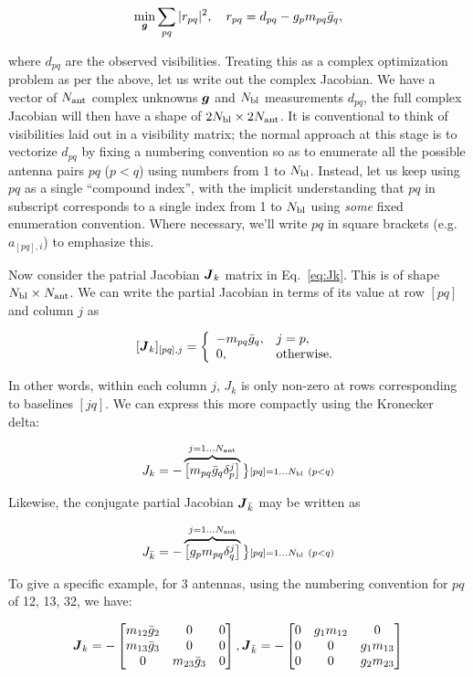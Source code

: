 \documentclass[useAMS,usenatbib]{mn2e}
\newcommand{\mat}[1]{{\bmath{#1}}}
\newcommand{\JJ}{\mat{J}} %
\begin{document}
\begin{equation}
\label{eq:cal:DI}
\min_{\bmath{g}}\sum_{pq}|r_{pq}|^2,~~~r_{pq}=d_{pq}-g_p m_{pq} \bar{g}_q, 
\end{equation}

where $d_{pq}$ are the observed visibilities. Treating this as a complex optimization problem as per the above, 
let us write out the complex Jacobian. 
We have a vector of $N_\mathrm{ant}$ complex unknowns $\bmath{g}$ and $N_\mathrm{bl}$ measurements $d_{pq}$, the full complex
Jacobian will then have a shape of $2N_\mathrm{bl}\times2N_\mathrm{ant}$. It is conventional
to think of visibilities laid out in a visibility matrix; the normal approach at this stage is to vectorize $d_{pq}$ 
by fixing a numbering convention so as to enumerate all the possible antenna pairs $pq$ ($p<q$) using numbers from 1 to $N_\mathrm{bl}$.
Instead, let us keep using $pq$ as a single ``compound index'', with the implicit understanding that $pq$ in 
subscript corresponds to a single index from 1 to $N_\mathrm{bl}$ using \emph{some} fixed enumeration convention. 
Where necessary, we'll write $pq$ in square brackets (e.g. $a_{[pq],i}$) to emphasize this.

Now consider the patrial Jacobian $\JJ_k$ matrix in Eq.~\ref{eq:Jk}. This is of shape $N_\mathrm{bl}\times N_\mathrm{ant}$. We can write the
partial Jacobian in terms of its value at row $[pq]$ and column $j$ as 

\[
[ \JJ_k ]_{[pq],j} = \left \{  
  \begin{array}{ll} 
  -m_{pq}\bar{g}_q,& j=p, \\
  0, & \mathrm{otherwise.}
  \end{array}
\right .
\]

In other words, within each column $j$, $J_k$ is only non-zero at rows corresponding to baselines $[jq]$. We can express 
this more compactly using the Kronecker delta:


\[
J_k = - \overbrace{ \Matrix{c}{ m_{pq}\bar{g}_q\delta^{j}_p } } ^{j=1\dots \Na} \big \}{\scriptstyle [pq]=1\dots \Nbl~(p<q)}
\]

Likewise, the conjugate partial Jacobian $\JJ_{\bar{k}}$ may be written as

\[
J_{\bar{k}} = - \overbrace{ \Matrix{c}{ g_p m_{pq} \delta^{j}_q } } ^{j=1\dots \Na} \big \}{\scriptstyle [pq]=1\dots \Nbl~(p<q)}
\]

To give a specific example, for 3 antennas, using the numbering convention for $pq$ of
12, 13, 32, we have:

\[
\JJ_k = - \Matrix{ccc}{m_{12}\bar{g}_2 & 0 & 0 \\ m_{13}\bar{g}_3 & 0 & 0 \\ 0 & m_{23}\bar{g}_3 & 0 },
\JJ_{\bar{k}} = - \Matrix{ccc}{0 & g_1 m_{12} & 0 \\ 0 & 0 & g_1 m_{13} \\ 0 & 0 & g_2 m_{23} }
\]
\end{document}
